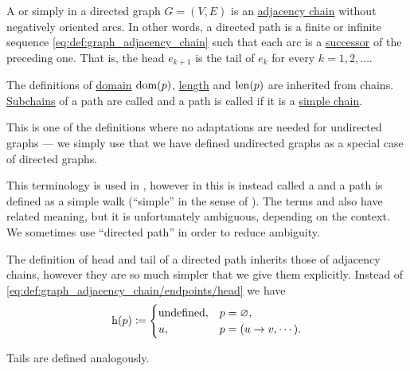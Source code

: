 \begin{definition}\label{def:graph_directed_path}
  A  or simply  in a directed graph \( G = (V, E) \) is an \hyperref[def:graph_adjacency_chain]{adjacency chain} without negatively oriented arcs. In other words, a directed path is a finite or infinite sequence \eqref{eq:def:graph_adjacency_chain} such that each arc is a \hyperref[def:graph/adjacency]{successor} of the preceding one. That is, the head \( e_{k+1} \) is the tail of \( e_k \) for every \( k = 1, 2, \ldots \).

  The definitions of \hyperref[def:graph_adjacency_chain/domain]{domain} \( \operatorname{dom}(p) \), \hyperref[def:graph_adjacency_chain/length]{length} and \( \operatorname{len}(p) \) are inherited from chains. \hyperref[def:graph_adjacency_chain/subchain]{Subchains} of a path are called  and a path is called  if it is a \hyperref[def:graph_adjacency_chain/simple]{simple chain}.

  This is one of the definitions where no adaptations are needed for undirected graphs --- we simply use that we have defined undirected graphs as a special case of directed graphs.

  This terminology is used in , however in \cite[sec. 5.2]{Erickson2019} this is instead called a  and a path is defined as a simple walk (\enquote{simple} in the sense of ). The terms  and  also have related meaning, but it is unfortunately ambiguous, depending on the context. We sometimes use \enquote{directed path} in order to reduce ambiguity.

  \begin{thmenum}
     The definition of head and tail of a directed path inherits those of adjacency chains, however they are so much simpler that we give them explicitly. Instead of \eqref{eq:def:graph_adjacency_chain/endpoints/head} we have
    \begin{equation}\label{eq:def:graph_directed_path/endpoints/head}
      \head(p) \coloneqq \begin{cases}
        \T{undefined}, &p = \varnothing, \\
        u,             &p = (u \to v, \cdots).
      \end{cases}
    \end{equation}

    Tails are defined analogously.


\end{thmenum}
\end{definition}
